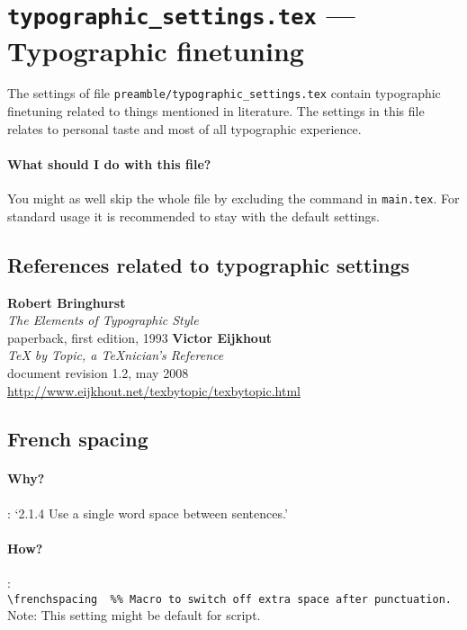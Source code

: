 \section{\texttt{typographic\_settings.tex} --- Typographic finetuning}
The settings of file \verb#preamble/typographic_settings.tex# contain
typographic finetuning related to things mentioned in literature.  The
settings in this file relates to personal taste and most of all typographic
experience. 

\paragraph{What should I do with this file?} You might as well skip the whole
file by excluding the \verb## command
in \texttt{main.tex}.  For standard usage it is recommended to stay with the
default settings.


\subsection{References related to typographic settings}

\begin{thebibliography}{9}
    \textbf{Robert Bringhurst}\\
    \textit{The Elements of Typographic Style}\\
    paperback, first edition, 1993
    \textbf{Victor Eijkhout}\\
    \textit{\TeX{} by Topic, a \TeX{}nician's Reference}\\
    document revision 1.2, may 2008\\
    \url{http://www.eijkhout.net/texbytopic/texbytopic.html}
\end{thebibliography}
\subsection{French spacing}
\paragraph{Why?} \cite[p 28, p 30]{Bringhurst1993}: `2.1.4 Use a single word space between sentences.'
\paragraph{How?} \cite[p 185]{Eijkhout2008}:\\
\verb#\frenchspacing  %% Macro to switch off extra space after punctuation.# \\
Note: This setting might be default for  script.
